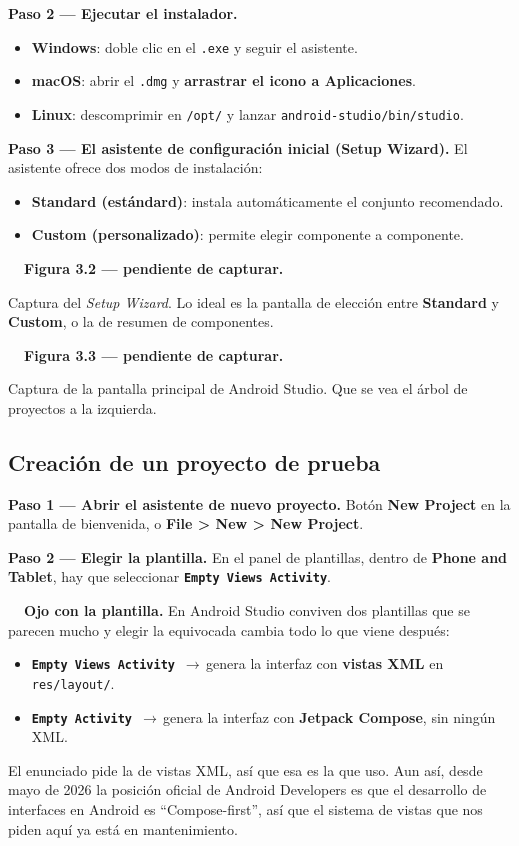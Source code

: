 \documentclass[11pt,a4paper]{article}
\newcommand{\archivo}[1]{\texttt{\color{accent!85!black}#1}}
\newcommand{\flecha}{\,$\rightarrow$\,}
\newcommand{\campo}[1]{\textbf{\color{primary}#1}}
\newcommand{\figpend}[2]{%
	\begin{capturabox}
		\textbf{\color{accent2!70!black}\faCamera\ \ Figura #1 --- pendiente de capturar.}%
		\par\smallskip #2
	\end{capturabox}%
}
\begin{document}
	\campo{Paso 2 --- Ejecutar el instalador.}
	\begin{itemize}[leftmargin=*,itemsep=0.15em]
		\item \textbf{Windows}: doble clic en el \archivo{.exe} y seguir el asistente.
		\item \textbf{macOS}: abrir el \archivo{.dmg} y \textbf{arrastrar el icono a Aplicaciones}.
		\item \textbf{Linux}: descomprimir en \archivo{/opt/} y lanzar \archivo{android-studio/bin/studio}.
	\end{itemize}
	
	\campo{Paso 3 --- El asistente de configuración inicial (Setup Wizard).}
	El asistente ofrece dos modos de instalación:
	\begin{itemize}[leftmargin=*,itemsep=0.15em]
		\item \textbf{Standard (estándard)}: instala automáticamente el conjunto recomendado.
		\item \textbf{Custom (personalizado)}: permite elegir componente a componente.
	\end{itemize}
	
	\figpend{3.2}{Captura del \emph{Setup Wizard}. Lo ideal es la pantalla de elección entre \textbf{Standard} y \textbf{Custom}, o la de resumen de componentes.}
	
	\figpend{3.3}{Captura de la pantalla principal de Android Studio. Que se vea el árbol de proyectos a la izquierda.}
	
	\subsection{Creación de un proyecto de prueba}
	
	\campo{Paso 1 --- Abrir el asistente de nuevo proyecto.}
	Botón \textbf{New Project} en la pantalla de bienvenida, o \textbf{File > New > New Project}.
	
	\campo{Paso 2 --- Elegir la plantilla.}
	En el panel de plantillas, dentro de \textbf{Phone and Tablet}, hay que seleccionar \textbf{\texttt{Empty Views Activity}}.
	
	\begin{warnbox}
		\textbf{\color{accent!80!black}\faExclamationTriangle\ \ Ojo con la plantilla.}
		En Android Studio conviven dos plantillas que se parecen mucho y elegir la equivocada cambia todo lo que viene después:
		\begin{itemize}[leftmargin=*,itemsep=0.15em]
			\item \textbf{\texttt{Empty Views Activity}} \flecha genera la interfaz con \textbf{vistas XML} en \archivo{res/layout/}.
			\item \textbf{\texttt{Empty Activity}} \flecha genera la interfaz con \textbf{Jetpack Compose}, sin ningún XML.
		\end{itemize}
		El enunciado pide la de vistas XML, así que esa es la que uso. Aun así, desde mayo de 2026 la posición oficial de Android Developers es que el desarrollo de interfaces en Android es \enquote{Compose-first}, así que el sistema de vistas que nos piden aquí ya está en mantenimiento.
	\end{warnbox}
	
\end{document}
